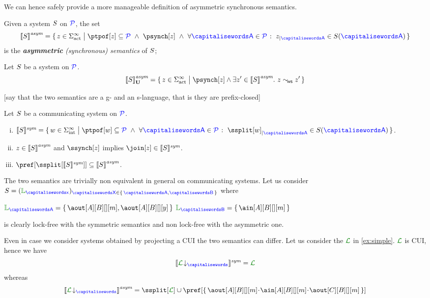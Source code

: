 We can hence safely provide a more manageable definition of asymmetric synchronous semantics. 
\begin{definition}\label{def:syncSem}
  Given a system $S$ on $\mathcal{\color{blue}{P}}$, the set
  \[
	 \asem{\aCS} = \Set{z \in \alfact^\infty \sst \ptpof[z] \subseteq \ptpset \ \land\ \psynch[z]\  \land\ \forall \p \in
		\ptpset \qst \filter{z}{\p} \in \aCS(\p)  }
  \]
  is the \emph{{\bf asymmetric} (synchronous) semantics} of $S$;
\end{definition}

\begin{lemma}
Let $S$ be a system on $\mathcal{\color{blue}{P}}$.
$$\gasem{\aCS} = \Set{z\in\alfact^\infty \sst  \psynch[z] \land \exists z'\in\asem{\aCS}.\  z\commds z'}$$ 
\end{lemma}

[say that the two semantics are a g- and an s-language, that is they are prefix-closed]

\begin{lemma}
\label{fac:asymmsubsymm}
Let  $S$ be a communicating system on $\mathcal{\color{blue}{P}}$.
\begin{enumerate}[i)]
\item
$\ssem{\aCS} =  
\Set{\acword \in \alfint^\infty \sst  
\ptpof[\acword] \subseteq \ptpset \ \land\ \forall \p \in \ptpset \qst \filter{\ssplit[\acword]}{\p} \in \aCS(\p)}$.
\item
\label{fac:asymmsubsymm-aimps}
$z\in{\llbracket S\rrbracket}^{\textit{asym}}$ and $\ssynch[z]$ implies $\join[z]\in\ssem{\aCS}$.
\item
\label{fac:asymmsubsymm-asubs}
$\pref[{\ssplit[{\ssem{\aCS}}]}] \subseteq \asem{\aCS}$.
\end{enumerate}
\end{lemma}

\begin{example}
\label{ex:simple2}
The two semantics are trivially non equivalent in general on communicating systems.
Let us consider $\aCS = ({\alang}_{\px})_{\ptp[X] \in \Set{\p,\q}}$ where\\
\centerline{$\alang_{\p}= \Set{\aout[A][B][][m], \aout[A][B][][y]}$ \qquad $\alang_{\q}= \Set{\ain[A][B][][m]}$ }
is clearly lock-free with the symmetric semantics and non lock-free with the asymmetric one.

 Even in case we consider systems
obtained by projecting a CUI \sclang the two semantics can differ. 
Let us consider the \sclang $\clang$ in \cref{ex:simple}.
$\clang$ is CUI, hence we have 
  $$\ssem{\proj{\clang}{}} = \clang$$ 
whereas 
  $$\asem{\proj{\clang}{}} = \ssplit[\clang] \cup \pref[\Set{\aout[A][B][][m]\cat\ain[A][B][][m]\cat\aout[C][B][][m]}]$$
\finex
\end{example} 

